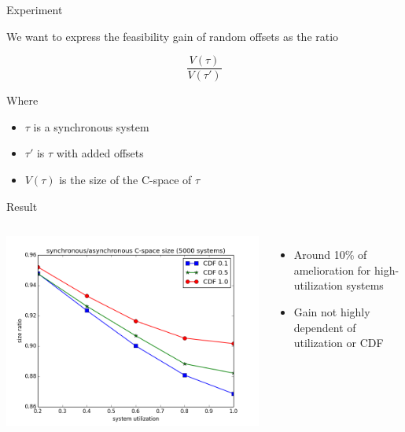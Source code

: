 \documentclass{beamer}
\begin{document}
    \begin{frame}{Experiment}

        We want to express the feasibility gain of random offsets as the ratio

        $$\frac{V(\tau)}{V(\tau')}$$

        Where
        \begin{itemize}
            \item $\tau$ is a synchronous system
            \item $\tau'$ is $\tau$ with added offsets
            \item $V(\tau)$ is the size of the C-space of $\tau$
        \end{itemize}

    \end{frame}

    \begin{frame}{Result}

        \begin{columns}[c]


            \includegraphics[width=1.2\textwidth]{figs/sizeratio.png}


            \begin{itemize}
                \item Around 10\% of amelioration for high-utilization systems
                \item Gain not highly dependent of utilization or CDF
            \end{itemize}

        \end{columns}

    \end{frame}
\end{document}
